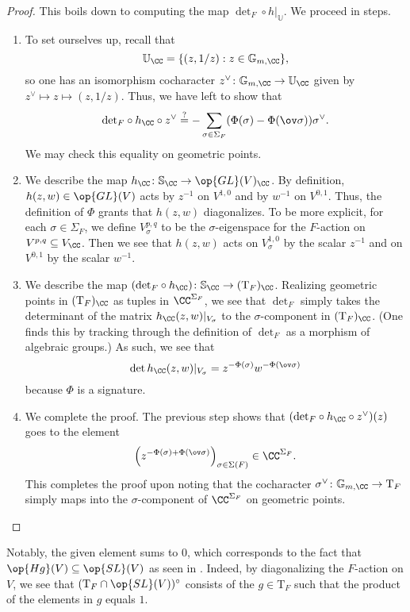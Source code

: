 \documentclass[../thesis.tex]{subfiles}
\begin{document}
\begin{proof}
	This boils down to computing the map ${\det_F}\circ h|_{\mathbb U}$. We proceed in steps.
	\begin{enumerate}
		\item To set ourselves up, recall that
		\[\mathbb U_\CC=\{(z,1/z):z\in\mathbb G_{m,\CC}\},\]
		so one has an isomorphism cocharacter $z^\lor\colon\mathbb G_{m,\CC}\to\mathbb U_\CC$ given by $z^\lor\mapsto z\mapsto(z,1/z)$. Thus, we have left to show that
		\[{\det}_F\circ h_\CC\circ z^\lor\stackrel?=-\sum_{\sigma\in\Sigma_F}(\Phi(\sigma)-\Phi(\ov\sigma))\sigma^\lor.\]
		We may check this equality on geometric points.
		\item We describe the map $h_\CC\colon\mathbb S_\CC\to\op{GL}(V)_\CC$. By definition, $h(z,w)\in\op{GL}(V)$ acts by $z^{-1}$ on $V^{1,0}$ and by $w^{-1}$ on $V^{0,1}$. Thus, the definition of $\Phi$ grants that $h(z,w)$ diagonalizes. To be more explicit, for each $\sigma\in\Sigma_F$, we define $V^{p,q}_\sigma$ to be the $\sigma$-eigenspace for the $F$-action on $V^{p,q}\subseteq V_\CC$. Then we see that $h(z,w)$ acts on $V^{1,0}_\sigma$ by the scalar $z^{-1}$ and on $V^{0,1}$ by the scalar $w^{-1}$.
		\item We describe the map $({\det_F}\circ h_\CC)\colon\mathbb S_\CC\to(\mathrm T_F)_\CC$. Realizing geometric points in $(\mathrm T_F)_\CC$ as tuples in $\CC^{\Sigma_F}$, we see that ${\det_F}$ simply takes the determinant of the matrix $h_\CC(z,w)|_{V_\sigma}$ to the $\sigma$-component in $(\mathrm T_F)_\CC$. (One finds this by tracking through the definition of $\det_F$ as a morphism of algebraic groups.) As such, we see that
		\[\det h_\CC(z,w)|_{V_\sigma}=z^{-\Phi(\sigma)}w^{-\Phi(\ov\sigma)}\]
		because $\Phi$ is a signature.
		\item We complete the proof. The previous step shows that $({\det_F}\circ h_\CC\circ z^\lor)(z)$ goes to the element
		\[\left(z^{-\Phi(\sigma)+\Phi(\ov\sigma)}\right)_{\sigma\in\Sigma(F)}\in\CC^{\Sigma_F}.\]
		This completes the proof upon noting that the cocharacter $\sigma^\lor\colon\mathbb G_{m,\CC}\to\mathrm T_F$ simply maps into the $\sigma$-component of $\CC^{\Sigma_F}$ on geometric points.
		\qedhere
	\end{enumerate}
\end{proof}
\begin{remark}
	Notably, the given element sums to $0$, which corresponds to the fact that $\op{Hg}(V)\subseteq\op{SL}(V)$ as seen in . Indeed, by diagonalizing the $F$-action on $V$, we see that $(\mathrm T_F\cap\op{SL}(V))^\circ$ consists of the $g\in\mathrm T_F$ such that the product of the elements in $g$ equals $1$.
\end{remark}
\end{document}
